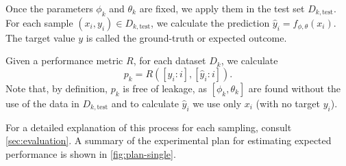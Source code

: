Once the parameters $\phi_k$ and $\theta_k$ are fixed, we apply them
in the test set $D_{k,\text{test}}$.  For each sample $(x_i, y_i) \in D_{k,\text{test}}$,
we calculate the prediction $\hat{y}_i = f_{\phi,\theta}(x_i)$.  The target value $y$ is
called the ground-truth or expected outcome.

Given a performance metric $R$, for each dataset $D_k$, we calculate
$$p_k = R\!\left(\left[y_i : i\right], \left[\hat{y}_i : i\right]\right)\text{.}$$
Note that, by definition, $p_k$ is free of \gls{leakage}, as $\left[\phi_k,
\theta_k\right]$ are found without the use of the data in $D_{k,\text{test}}$ and to
calculate $\hat{y}_i$ we use only $x_i$ (with no target $y_i$).

For a detailed explanation of this process for each sampling, consult
\cref{sec:evaluation}.
A summary of the experimental plan for estimating expected performance is shown in
\cref{fig:plan-single}.

